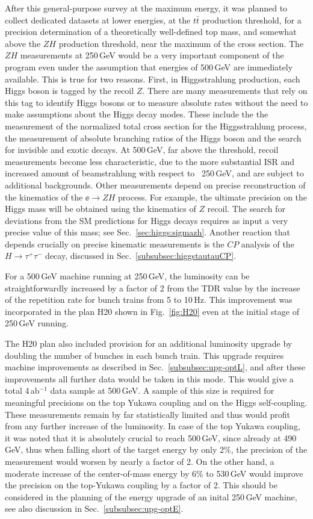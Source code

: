 After this general-purpose survey at the maximum energy, it was planned to collect dedicated datasets at lower energies, at the $t\bar{t}$ production threshold, for a precision determination of a theoretically well-defined top mass, and somewhat above the $ZH$ production threshold, near the maximum of the cross section.  The $ZH$ measurements at 250\,GeV would be a very important component of the program  even under the assumption that energies of  500\,GeV are immediately available.  This is true for two reasons.  First, in Higgsstrahlung production, each Higgs boson  is tagged by the recoil $Z$.  There are many measurements that 
rely on this tag to identify Higgs bosons or to measure absolute rates without the need to make assumptions about the Higgs decay modes.  These include the
the measurement of the normalized total cross section for the Higgsstrahlung process, the measurement  of  absolute branching ratios of the Higgs boson and the search for invisible and exotic decays.  At 500\,GeV, far above the threshold, recoil measurements become less characteristic, due to the more substantial ISR and increased amount of beamstrahlung with respect to \ 250\,GeV, and are subject to additional backgrounds.   Other measurements depend on precise reconstruction of the kinematics of the $\ee\to ZH$ process.
For example, the ultimate precision on 
the Higgs mass will be obtained using the kinematics of $Z$ recoil.  The search for deviations from the SM predictions for 
 Higgs decays requires as input a very precise value of this mass; see Sec.~\ref{sec:higgs:sigmazh}.
Another reaction that depends crucially on precise kinematic measurements is the $CP$ analysis of the $H \to \tau^+ \tau^-$ decay, discussed in Sec.~\ref{subsubsec:higgstautauCP}.

For a 500\,GeV machine running at 250\,GeV, the luminosity can be straightforwardly increased by a factor of 2 from the TDR value 
by the increase of the repetition rate for bunch trains  from 5 to 10\,Hz.  This improvement was incorporated in the plan H20 shown in Fig.~\ref{fig:H20}  even
at the initial stage of 250\,GeV running.

The H20 plan also included provision for an additional luminosity upgrade by doubling the number of bunches in each bunch 
train. This upgrade requires machine improvements as described in Sec.~\ref{subsubsec:upg-optL}, and after these improvements all further 
data would be taken in this mode.
This would give a total  4\,ab$^{-1}$ data sample at 500\,GeV.   A sample of this size is required for meaningful precisions on the top Yukawa coupling and on the Higgs self-coupling. These measurements remain by far statistically limited and  thus would profit from any further increase of the luminosity. In case of the top Yukawa coupling, it was noted that it is absolutely crucial to reach 500\,GeV, since already at 490\,GeV, thus when falling short of the target energy by only 2\%, the precision of the measurement would worsen by nearly a factor of 2. On the other hand, a moderate increase of the center-of-mass energy by 6\% to 530\,GeV would improve the precision on the top-Yukawa coupling by a factor of 2. This should be considered in the planning of the energy upgrade of an inital 250\,GeV machine, see also discussion in Sec.~\ref{subsubsec:upg-optE}.

